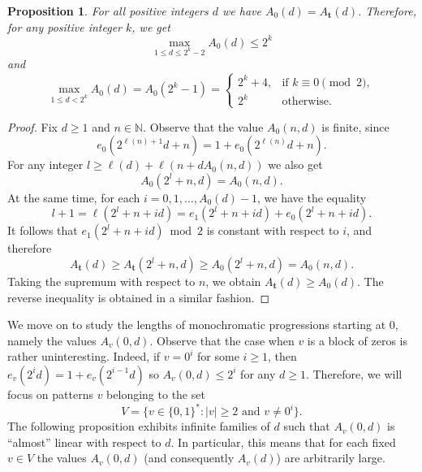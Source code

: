 \documentclass[a4paper,11pt]{amsart}
\newtheorem{prop}[thm]{Proposition}
\theoremstyle{definition}
\newcommand{\N}{\mathbb{N}}
\begin{document}
\begin{prop} \label{prop:A_0=A_t}
For all positive integers $d$ we have $A_{0}(d) = A_{\mathbf{t}}(d)$.
Therefore, for any positive integer $k$, we get
$$  \max_{1 \leq d \leq 2^k-2} A_{0}(d)  \leq  2^k$$
and
$$ \max_{1 \leq d < 2^k} A_0(d) = A_0(2^k-1) = \begin{cases}
2^k + 4, &\text{if } k \equiv 0 \pmod{2},\\
2^k &\text{otherwise}.
\end{cases}   $$
\end{prop}
\begin{proof}
Fix $d \geq 1$ and $n \in \N$. Observe that the value $A_0(n,d)$ is finite, since 
$$ e_{0}(2^{\ell(n)+1}d+n) = 1+ e_{0}(2^{\ell(n)}d+ n).$$
For any integer $l \geq \ell(d) + \ell(n+d A_{0}(n,d))$ we also get
$$ A_0(2^l +n,d) = A_0(n,d).  $$
At the same time, for each $i = 0,1, \ldots, A_{0}(d)-1$, we have the equality
$$ l+1 = \ell(2^l+n+id) = e_{1}(2^l+n+id) + e_{0}(2^l+n+id). $$
It follows that $e_{1}(2^l+n+id) \bmod{2}$ is constant with respect to $i$, and therefore 
$$A_{\mathbf{t}}(d) \geq A_{\mathbf{t}}(2^l+n,d) \geq A_0(2^l +n,d) = A_0(n,d).$$
Taking the supremum with respect to $n$, we obtain $A_{\mathbf{t}}(d) \geq A_0(d)$. The reverse inequality is obtained in a similar fashion.
\end{proof}

We move on to study the lengths of monochromatic progressions starting at $0$, namely the values $A_v(0,d)$. Observe that the case when $v$ is a block of zeros is rather uninteresting. Indeed, if $v = 0^i$ for some $i \geq 1$, then $e_v(2^i d) = 1 + e_v(2^{i-1} d)$ so $A_v(0,d) \leq 2^i$ for any $d \geq 1$. Therefore, we will focus on patterns $v$ belonging to the set
$$ V = \{ v \in \{0,1\}^*: |v| \geq 2 \text{ and } v \neq 0^i\}. $$
The following proposition exhibits infinite families of $d$ such that $A_v(0,d)$ is ``almost'' linear with respect to $d$. In particular, this means that for each fixed $v \in V$ the values $A_v(0,d)$ (and consequently $A_v(d)$) are arbitrarily large.
\end{document}
